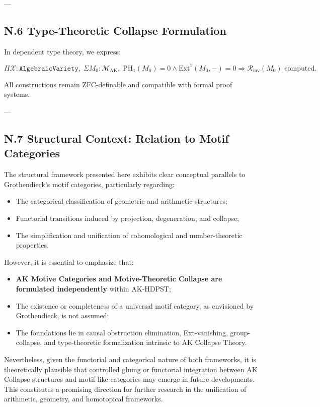 \documentclass[11pt]{article}
\begin{document}
---

\subsection*{N.6 Type-Theoretic Collapse Formulation}

In dependent type theory, we express:

\[
\Pi \mathcal{X} : \texttt{AlgebraicVariety}, \;
\Sigma M_0 : \mathcal{M}_{\mathrm{AK}}, \;
\mathrm{PH}_1(M_0) = 0 \wedge \mathrm{Ext}^1(M_0, -) = 0
\Rightarrow 
\mathcal{R}_{\mathrm{inv}}(M_0) \text{ computed}.
\]

All constructions remain ZFC-definable and compatible with formal proof systems.

---

\subsection*{N.7 Structural Context: Relation to Motif Categories}

The structural framework presented here exhibits clear conceptual parallels to Grothendieck's motif categories, particularly regarding:

\begin{itemize}
  \item The categorical classification of geometric and arithmetic structures;
  \item Functorial transitions induced by projection, degeneration, and collapse;
  \item The simplification and unification of cohomological and number-theoretic properties.
\end{itemize}

However, it is essential to emphasize that:

\begin{itemize}
  \item \textbf{AK Motive Categories and Motive-Theoretic Collapse are formulated independently} within AK-HDPST;
  \item The existence or completeness of a universal motif category, as envisioned by Grothendieck, is not assumed;
  \item The foundations lie in causal obstruction elimination, Ext-vanishing, group-collapse, and type-theoretic formalization intrinsic to AK Collapse Theory.
\end{itemize}

Nevertheless, given the functorial and categorical nature of both frameworks, it is theoretically plausible that controlled gluing or functorial integration between AK Collapse structures and motif-like categories may emerge in future developments. This constitutes a promising direction for further research in the unification of arithmetic, geometry, and homotopical frameworks.
\end{document}
